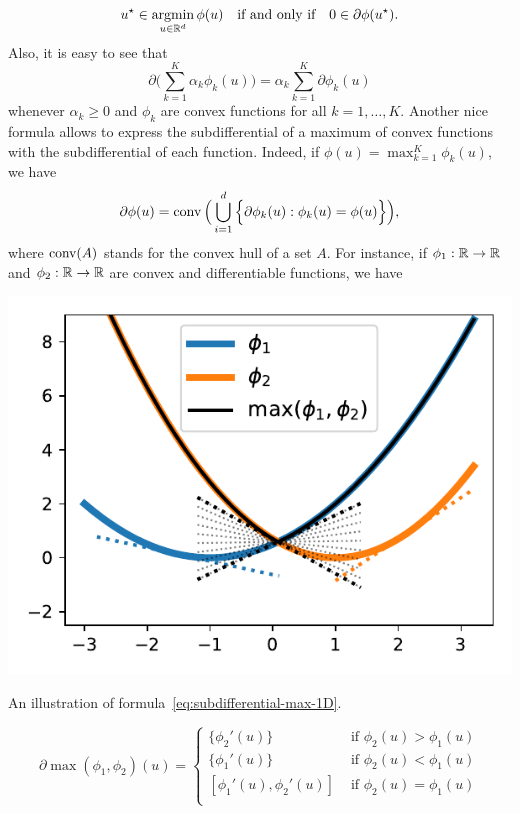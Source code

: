 \begin{equation*}
	u^\star \in \operatorname*{argmin}_{u \in \mathbb R^d} \phi(u) \quad \text{if and only if} \quad 0 \in \partial \phi(u^\star).
\end{equation*}
Also, it is easy to see that
\begin{equation*}
	\partial \Big( \sum_{k=1}^K \alpha_k \phi_k(u) \Big) =  \alpha_k \sum_{k=1}^K \partial \phi_k(u)
\end{equation*}
whenever $\alpha_k \geq 0$ and $\phi_k$ are convex functions for all $k=1, \ldots, K$.
Another nice formula allows to express the subdifferential of a maximum of convex functions with the subdifferential of each function.
Indeed, if $\phi(u) = \max_{k=1}^K \phi_k(u)$, we have
\begin{equation}
	\label{eq:subdifferential-max}
	\partial \phi(u) = \operatorname{conv}\Big( \bigcup_{i=1}^d \Big\{ \partial \phi_k(u) : \phi_k(u) = \phi(u) \Big\} \Big),
\end{equation}
where $\operatorname{conv}(A)$ stands for the convex hull of a set $A$.
For instance, if $\phi_1 : \mathbb R \rightarrow \mathbb R$ and $\phi_2 : \mathbb R \rightarrow \mathbb R$ are convex and differentiable functions, we have%
\begin{marginfigure}[*-3]
	\includegraphics{assets/subdifferential-max.pdf}
	\caption{An illustration of formula~\eqref{eq:subdifferential-max-1D}.}
	\label{fig:subdifferential-max}
\end{marginfigure}
\begin{equation}
	\label{eq:subdifferential-max-1D}
	\partial \max(\phi_1, \phi_2)(u) = 
	\begin{cases}
	\{ \phi_2'(u) \} &\text{ if } \phi_2(u) > \phi_1(u) \\
	\{ \phi_1'(u) \} &\text{ if } \phi_2(u) < \phi_1(u) \\
	[ \phi_1'(u), \phi_2'(u) ] &\text{ if } \phi_2(u) = \phi_1(u) \\
	\end{cases}
\end{equation}
